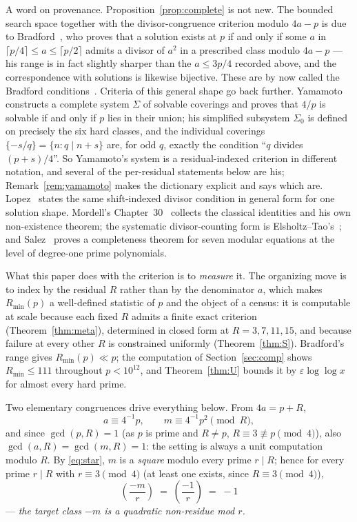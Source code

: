\documentclass[11pt]{article}
\theoremstyle{plain}
\theoremstyle{remark}
\theoremstyle{plain}
\numberwithin{equation}{section}
\newcommand{\legendre}[2]{\genfrac{(}{)}{}{1}{#1}{#2}}
\begin{document}
A word on provenance. Proposition~\ref{prop:complete} is not new.
The bounded search space together with the divisor-congruence
criterion modulo $4a - p$ is due to Bradford~\cite{Bradford}, who
proves that a solution exists at $p$ if and only if some $a$ in
$\lceil p/4 \rceil \le a \le \lceil p/2 \rceil$ admits a divisor of
$a^2$ in a prescribed class modulo $4a - p$ --- his range is in fact
slightly sharper than the $a \le 3p/4$ recorded above, and the
correspondence with solutions is likewise bijective. These are by now
called the Bradford conditions~\cite{MihneaBogdan}. Criteria of this
general shape go back further. Yamamoto~\cite{Yamamoto} constructs a
complete system $\Sigma$ of solvable coverings and proves that
$4/p$ is solvable if and only if $p$ lies in their union; his
simplified subsystem $\Sigma_0$ is defined on precisely the six hard
classes, and the individual coverings $\{-s/q\} = \{n : q \mid n+s\}$
are, for odd $q$, exactly the condition ``$q$ divides
$(p+s)/4$''. So Yamamoto's system is a residual-indexed criterion in
different notation, and several of the per-residual statements below
are his; Remark~\ref{rem:yamamoto} makes the dictionary explicit and
says which are. Lopez~\cite{Lopez} states the same shift-indexed
divisor condition in general form for one solution shape. Mordell's
Chapter~30~\cite[Ch.~30]{Mordell} collects the classical identities
and his own non-existence theorem; the systematic divisor-counting
form is Elsholtz--Tao's~\cite{ElsholtzTao}; and
Salez~\cite{Salez} proves a completeness theorem for seven modular
equations at the level of degree-one prime polynomials.

What this paper does with the criterion is to \emph{measure} it. The
organizing move is to index by the residual $R$ rather than by the
denominator $a$, which makes $R_{\min}(p)$ a well-defined statistic
of $p$ and the object of a census: it is computable at scale because
each fixed $R$ admits a finite exact criterion
(Theorem~\ref{thm:meta}), determined in closed form at
$R = 3, 7, 11, 15$, and because failure at every other $R$ is
constrained uniformly (Theorem~\ref{thm:S}). Bradford's range gives
$R_{\min}(p) \ll p$; the computation of Section~\ref{sec:comp}
shows $R_{\min} \le 111$ throughout $p < 10^{12}$, and
Theorem~\ref{thm:U} bounds it by $\varepsilon\log\log x$ for almost
every hard prime.

Two
elementary congruences drive everything below. From $4a = p + R$,
\begin{equation}\label{eq:star}
  a \equiv 4^{-1}p, \qquad m \equiv 4^{-1}p^2 \pmod R,
\end{equation}
and since $\gcd(p, R) = 1$ (as $p$ is prime and $R \ne p$,
$R \equiv 3 \not\equiv p \pmod 4$), also
$\gcd(a, R) = \gcd(m, R) = 1$: the setting is always a unit computation
modulo $R$. By \eqref{eq:star}, $m$ is a \emph{square} modulo every prime
$r \mid R$; hence for every prime $r \mid R$ with $r \equiv 3 \pmod 4$
(at least one exists, since $R \equiv 3 \pmod 4$),
\begin{equation}\label{eq:target}
  \legendre{-m}{r} \;=\; \legendre{-1}{r}
  \;=\; -1
\end{equation}
--- \emph{the target class $-m$ is a quadratic non-residue mod $r$.}
\end{document}
